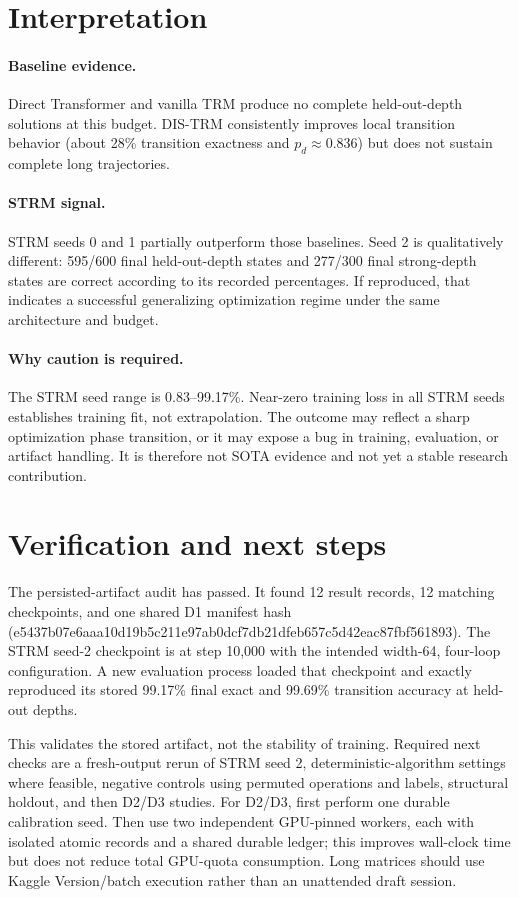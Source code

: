 \documentclass[11pt]{article}
\newcommand{\pd}{\ensuremath{p_d}}
\begin{document}
\section{Interpretation}
\paragraph{Baseline evidence.} Direct Transformer and vanilla TRM produce no
complete held-out-depth solutions at this budget. DIS-TRM consistently improves
local transition behavior (about 28\% transition exactness and
$\pd\approx0.836$) but does not sustain complete long trajectories.

\paragraph{STRM signal.} STRM seeds 0 and 1 partially outperform those
baselines. Seed 2 is qualitatively different: 595/600 final held-out-depth
states and 277/300 final strong-depth states are correct according to its
recorded percentages. If reproduced, that indicates a successful generalizing
optimization regime under the same architecture and budget.

\paragraph{Why caution is required.} The STRM seed range is 0.83--99.17\%.
Near-zero training loss in all STRM seeds establishes training fit, not
extrapolation. The outcome may reflect a sharp optimization phase transition,
or it may expose a bug in training, evaluation, or artifact handling. It is
therefore not SOTA evidence and not yet a stable research contribution.

\section{Verification and next steps}
The persisted-artifact audit has passed. It found 12 result records, 12 matching
checkpoints, and one shared D1 manifest hash
(e5437b07e6aaa10d19b5c211e97ab0dcf7db21dfeb657c5d42eac87fbf561893).
The STRM seed-2 checkpoint is at step 10,000 with the intended width-64,
four-loop configuration. A new evaluation process loaded that checkpoint and
exactly reproduced its stored 99.17\% final exact and 99.69\% transition
accuracy at held-out depths.

This validates the stored artifact, not the stability of training. Required
next checks are a fresh-output rerun of STRM seed 2, deterministic-algorithm
settings where feasible, negative controls using permuted operations and
labels, structural holdout, and then D2/D3 studies. For D2/D3, first perform
one durable calibration seed. Then use two independent GPU-pinned workers,
each with isolated atomic records and a shared durable ledger; this improves
wall-clock time but does not reduce total GPU-quota consumption. Long matrices
should use Kaggle Version/batch execution rather than an unattended draft
session.
\end{document}
